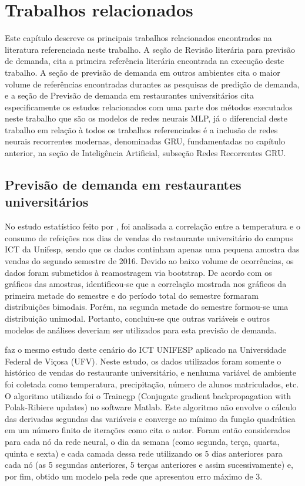 \chapter{Trabalhos relacionados} \label{cap:literatura}
  
    Este capítulo descreve os principais trabalhos relacionados encontrados na literatura referenciada neste trabalho.
    A seção de Revisão literária para previsão de demanda, cita a primeira referência literária encontrada na execução deste trabalho.
    A seção de previsão de demanda em outros ambientes cita o maior volume de referências encontradas durantes as pesquisas de predição de demanda, e a seção de Previsão de demanda em restaurantes universitários cita especificamente os estudos relacionados com uma parte dos métodos executados neste trabalho que são os modelos de redes neurais MLP, já o diferencial deste trabalho em relação à todos os trabalhos referenciados é a inclusão de redes neurais recorrentes modernas, denominadas GRU, fundamentadas no capítulo anterior, na seção de Inteligência Artificial, subseção Redes Recorrentes GRU.
    
    \section{Previsão de demanda em restaurantes universitários}
         No estudo estatístico feito por , foi analisada a correlação entre a temperatura e o consumo de refeições nos dias de vendas do restaurante universitário do campus ICT da Unifesp, sendo que os dados continham apenas uma pequena amostra das vendas do segundo semestre de 2016. Devido ao baixo volume de ocorrências, os dados foram submetidos à reamostragem via bootstrap. De acordo com os gráficos das amostras, identificou-se que a correlação mostrada nos gráficos da primeira metade do semestre e do período total do semestre formaram distribuições bimodais. Porém, na segunda metade do semestre formou-se uma distribuição unimodal. Portanto, concluiu-se que outras variáveis e outros modelos de análises deveriam ser utilizados para esta previsão de demanda.
        
          faz o mesmo estudo deste cenário do ICT UNIFESP aplicado na Universidade Federal de Viçosa (UFV). Neste estudo, os dados utilizados foram somente o histórico de vendas do restaurante universitário, e nenhuma variável de ambiente foi coletada como temperatura, precipitação, número de alunos matriculados, etc. O algoritmo utilizado foi o Traincgp (Conjugate gradient backpropagation with Polak-Ribiere updates) no software Matlab. Este algoritmo não envolve o cálculo das derivadas segundas das variáveis e converge ao mínimo da função quadrática em um número finito de iterações como cita o autor. Foram então considerados para cada nó da rede neural, o dia da semana (como segunda, terça, quarta, quinta e sexta) e cada camada dessa rede utilizando os 5 dias anteriores para cada nó (as 5 segundas anteriores, 5 terças anteriores e assim sucessivamente) e, por fim, obtido um modelo pela rede que apresentou erro máximo de 3.
        
